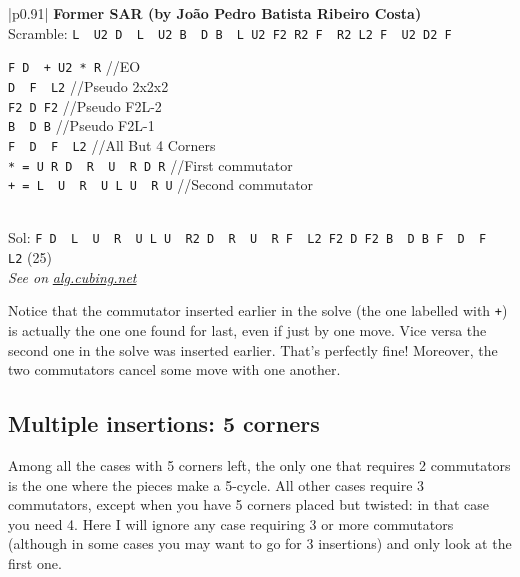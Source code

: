 \documentclass[11pt,a4paper]{book}
\newcommand{\p}{\textquotesingle}
\newcommand{\m}{\texttt}
\newcommand{\ps}{\p\,\,}
\newcommand{\comment}[1]{{\color{gray}\quad//#1}}
\begin{document}
\bigskip
\begin{tabular}{|p{}|}
\hline
\textbf{Former SAR (by Jo\~ao Pedro Batista Ribeiro Costa)}\\
\hline
Scramble: \m{L\ps U2 D\ps L\ps U2 B\ps D B\ps L U2 F2 R2 F\ps R2 L2 F\ps U2 D2 F}\\
\hline
\begin{minipage}[l]{0.650\textwidth}
\m{F D\ps + U2 * R} \comment{EO}\\
\m{D\ps F\ps L2} \comment{Pseudo 2x2x2}\\
\m{F2 D F2} \comment{Pseudo F2L-2}\\
\m{B\ps D B} \comment{Pseudo F2L-1}\\
\m{F\ps D\ps F\ps L2} \comment{All But 4 Corners}\\
\m{* = U R D\ps R\ps U\ps R D R\p} \comment{First commutator}\\
\m{+ = L\ps U\ps R\ps U L U\ps R U} \comment{Second commutator}
\end{minipage}
\begin{minipage}[c]{0.25\textwidth}

\end{minipage}\\
\hline
Sol: \m{F D\ps L\ps U\ps R\ps U L U\ps R2 D\ps R\ps U\ps R F\ps L2 F2 D F2 B\ps D B F\ps D\ps F\ps L2} (25)\\
\hline
\emph{See on }\href{https://alg.cubing.net/?alg=F_D-_(L-_U-_R-_U_L_U-_R_U)_U2_(U_R_D-_R-_U-_R_D_R-)_R_\%2F\%2FEO\%0AD-_F-_L2_\%2F\%2F2x2x2\%0AF2_D_F2_\%2F\%2FPseudo_F2L\%26\%2345\%3B2\%0AB-_D_B_\%2F\%2FF2L\%26\%2345\%3B1\%0AF-_D-_F-_\%2F\%2FAll_But_4_Corners&setup=_L_U2_D-_L-_U2_B-_D_B-_L_U2_F2_R2_F-_R2_L2_F-_U2_D2_F}{\emph{alg.cubing.net}}\\
\hline
\end{tabular}
\bigskip

Notice that the commutator inserted earlier in the solve (the one labelled with \m +) is actually the one one found for last, even if just by one move. Vice versa the second one in the solve was inserted earlier. That's perfectly fine!
Moreover, the two commutators cancel some move with one another.

\subsection{Multiple insertions: 5 corners}

Among all the cases with 5 corners left, the only one that requires 2 commutators is the one where the pieces make a 5-cycle. All other cases require 3 commutators, except when you have 5 corners placed but twisted: in that case you need 4. Here I will ignore any case requiring 3 or more commutators (although in some cases you may want to go for 3 insertions) and only look at the first one.
\end{document}
